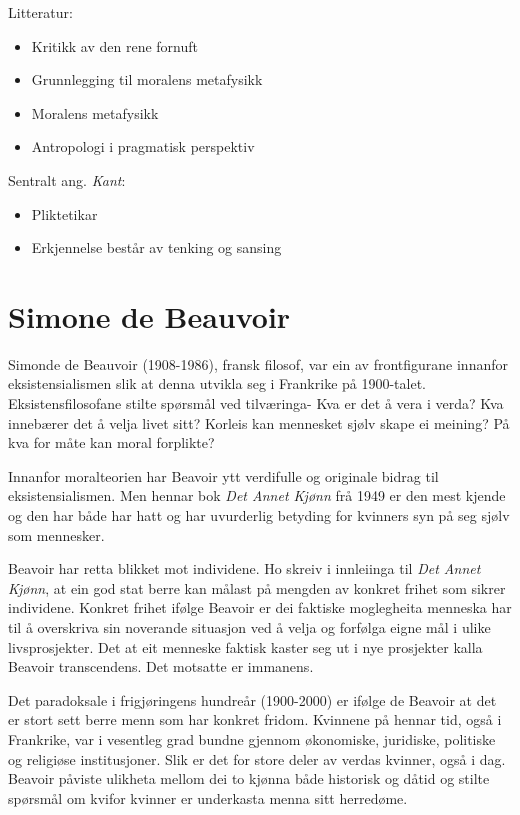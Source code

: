 \documentclass[a4paper]{IEEEtran}
\begin{document}
\begin{center}
Litteratur:
\end{center}
\begin{itemize}
    \item Kritikk av den rene fornuft
    \item Grunnlegging til moralens metafysikk
    \item Moralens metafysikk
    \item Antropologi i pragmatisk perspektiv
\end{itemize}\bigskip 

\begin{center}
Sentralt ang. \textit{Kant}:
\end{center}
\begin{itemize}\bigskip
    \item Pliktetikar
    \item Erkjennelse består av tenking og sansing
\end{itemize}\bigskip

\section{Simone de Beauvoir}
\label{beauvoir}\bigskip

Simonde de Beauvoir (1908-1986), fransk filosof, var ein av frontfigurane innanfor eksistensialismen slik at denna utvikla seg i Frankrike på 1900-talet. Eksistensfilosofane stilte spørsmål ved tilværinga- Kva er det å vera i verda? Kva innebærer det å velja livet sitt? Korleis kan mennesket sjølv skape ei meining? På kva for måte kan moral forplikte?\bigskip

Innanfor moralteorien har Beavoir ytt verdifulle og originale bidrag til eksistensialismen. Men hennar bok \textit{Det Annet Kjønn} frå 1949 er den mest kjende og den har både har hatt og har uvurderlig betyding for kvinners syn på seg sjølv som mennesker.\bigskip

Beavoir har retta blikket mot individene. Ho skreiv i innleiinga til \textit{Det Annet Kjønn}, at ein god stat berre kan målast på mengden av konkret frihet som sikrer individene. Konkret frihet ifølge Beavoir er dei faktiske moglegheita menneska har til å overskriva sin noverande situasjon ved å velja og forfølga eigne mål i ulike livsprosjekter. Det at eit menneske faktisk kaster seg ut i nye prosjekter kalla Beavoir transcendens. Det motsatte er immanens.\bigskip

Det paradoksale i frigjøringens hundreår (1900-2000) er ifølge de Beavoir at det er stort sett berre menn som har konkret fridom. Kvinnene på hennar tid, også i Frankrike, var i vesentleg grad bundne gjennom økonomiske, juridiske, politiske og religiøse institusjoner. Slik er det for store deler av verdas kvinner, også i dag. Beavoir påviste ulikheta mellom dei to kjønna både historisk og dåtid og stilte spørsmål om kvifor kvinner er underkasta menna sitt herredøme.\bigskip
\end{document}
